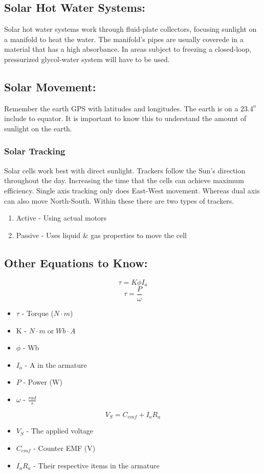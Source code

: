 \documentclass[a5paper]{report}
\begin{document}
	\subsection*{Solar Hot Water Systems:}
	Solar hot water systems work through fluid-plate collectors, focusing sunlight on a manifold to heat the water. The manifold's pipes are usually coverede in a material that has a high absorbance. In areas subject to freezing a closed-loop, pressurized glycol-water system will have to be used.

	\subsection*{Solar Movement:}
	Remember the earth GPS with latitudes and longitudes. The earth is on a $23.4^{o}$ include to equator. It is important to know this to understand the amount of sunlight on the earth.
	\subsubsection*{Solar Tracking}
	Solar cells work best with direct sunlight. Trackers follow the Sun's direction throughout the day. Increasing the time that the cells can achieve maximum efficiency. Single axis tracking only does East-West movement. Whereas dual axis can also move North-South. Within these there are two types of trackers.
	\begin{enumerate}
		\item Active - Using actual motors
		\item Passive - Uses liquid \& gas properties to move the cell
	\end{enumerate}

	\subsection*{Other Equations to Know:}
	$$\tau =K\phi I_{a}$$
	$$\tau = \frac{P}{\omega}$$
	\begin{itemize}
		\item $\tau$ - Torque ($N\cdot m$)
		\item K - $N\cdot m\;\text{or}\;Wb\cdot A$
		\item $\phi$ - Wb
		\item $I_{a}$ - A in the armature
		\item $P$ - Power (W)
		\item $\omega$ - $\frac{rad}{s}$
	\end{itemize}
	$$V_{S}=C_{emf}+I_{a}R_{a}$$
	\begin{itemize}
		\item $V_{S}$ - The applied voltage
		\item $C_{emf}$ - Counter EMF (V)
		\item $I_{a}R_{a}$ - Their respective items in the armature
	\end{itemize}
\end{document}
